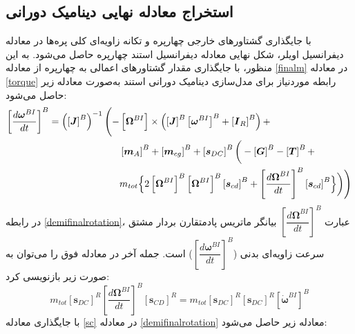 \subsection{ استخراج معادله نهایی دينامیک دورانی}
با جایگذاری گشتاورهای خارجی چهارپره و تكانه زاویه‌ای کلی پره‌ها در معادله دیفرانسیل اویلر، شكل نهایی معادله دیفرانسیل استند چهارپره حاصل می‌شود. به این منظور، با جایگذاری مقدار 
گشتاورهای اعمالی به چهارپره از معادله
\ref{finalm}
در معادله 
\ref{torque}
رابطه موردنیاز برای مدل‌سازی
دینامیک دورانی استند به‌صورت معادله زیر حاصل می‌شود:
\begin{equation}\label{demifinalrotation}
	\begin{split}
		\left[\dfrac{d\boldsymbol\omega^{BI}}{dt}\right]^B = 
		\left(\left[\boldsymbol J\right]^B\right)^{-1}\Bigg(
		-&\left[\boldsymbol\Omega^{BI}\right]\times\left(
		\left[\boldsymbol J\right]^B\left[\boldsymbol\omega^{BI}\right]^B
		+\left[\boldsymbol I_R\right]^B\right) + \\
		&\left[\boldsymbol m_A\right]^B + \left[\boldsymbol m_{cg}\right]^B +\left[\boldsymbol s_{DC}\right]^B
		\bigg(-\left[\boldsymbol G\right]^B
		-\left[\boldsymbol T\right]^B+ \\
		&m_{tot}\Bigl\{2
		\left[\boldsymbol \Omega^{BI}\right]^B
		\left[\boldsymbol \Omega^{BI}\right]^B
		\left[\boldsymbol s_{cd}\right]^B+
		\left[\dfrac{d\boldsymbol\Omega^{BI}}{dt}\right]^B
		\left[\boldsymbol s_{cd}\right]^B
		\Bigr\}\bigg)\Bigg)
	\end{split}
\end{equation}
در رابطه
\ref{demifinalrotation}،
عبارت
$\left[\dfrac{d\boldsymbol\Omega^{BI}}{dt}\right]^B$
بیانگر ماتریس پادمتقارن بردار مشتق سرعت‌ زاویه‌ای بدنی
($\left[\dfrac{d\boldsymbol\omega^{BI}}{dt}\right]^B $)
است. جمله آخر در معادله فوق را می‌توان به صورت زیر بازنویسی کرد:
\begin{equation}\label{sc}
	m_{tot}\left[\boldsymbol s_{DC}\right]^R
	\left[\dfrac{d\boldsymbol\Omega^{BI}}{dt}\right]^B\left[\boldsymbol s_{CD}\right]^R = 
	m_{tot}\left[\boldsymbol s_{DC}\right]^R\left[\boldsymbol s_{DC}\right]^R
	\left[\dot{\boldsymbol\omega}^{BI}\right]^B
\end{equation}
با جایگذاری معادله
\ref{sc}
در معادله
\ref{demifinalrotation}
معادله زیر حاصل می‌شود:
